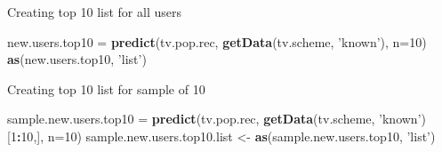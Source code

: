 \documentclass[
  ignorenonframetext,
]{beamer}
\newenvironment{Shaded}{\begin{snugshade}}{\end{snugshade}}
\newcommand{\DataTypeTok}[1]{\textcolor[rgb]{0.13,0.29,0.53}{#1}}
\newcommand{\DecValTok}[1]{\textcolor[rgb]{0.00,0.00,0.81}{#1}}
\newcommand{\KeywordTok}[1]{\textcolor[rgb]{0.13,0.29,0.53}{\textbf{#1}}}
\newcommand{\NormalTok}[1]{#1}
\newcommand{\OperatorTok}[1]{\textcolor[rgb]{0.81,0.36,0.00}{\textbf{#1}}}
\newcommand{\StringTok}[1]{\textcolor[rgb]{0.31,0.60,0.02}{#1}}
\begin{document}
\begin{frame}[fragile]{Creating top 10 list for all users}
\protect\hypertarget{creating-top-10-list-for-all-users}{}

\begin{Shaded}
\begin{Highlighting}[]
\NormalTok{new.users.top10 =}\StringTok{ }\KeywordTok{predict}\NormalTok{(tv.pop.rec, }\KeywordTok{getData}\NormalTok{(tv.scheme, }\StringTok{'known'}\NormalTok{), }\DataTypeTok{n=}\DecValTok{10}\NormalTok{)}
\KeywordTok{as}\NormalTok{(new.users.top10, }\StringTok{'list'}\NormalTok{)}
\end{Highlighting}
\end{Shaded}

\end{frame}

\begin{frame}[fragile]{Creating top 10 list for sample of 10}
\protect\hypertarget{creating-top-10-list-for-sample-of-10}{}

\begin{Shaded}
\begin{Highlighting}[]
\NormalTok{sample.new.users.top10 =}\StringTok{ }\KeywordTok{predict}\NormalTok{(tv.pop.rec, }\KeywordTok{getData}\NormalTok{(tv.scheme, }\StringTok{'known'}\NormalTok{)[}\DecValTok{1}\OperatorTok{:}\DecValTok{10}\NormalTok{,], }\DataTypeTok{n=}\DecValTok{10}\NormalTok{)}
\NormalTok{sample.new.users.top10.list <-}\StringTok{ }\KeywordTok{as}\NormalTok{(sample.new.users.top10, }\StringTok{'list'}\NormalTok{)}
\end{Highlighting}
\end{Shaded}

\end{frame}
\end{document}
